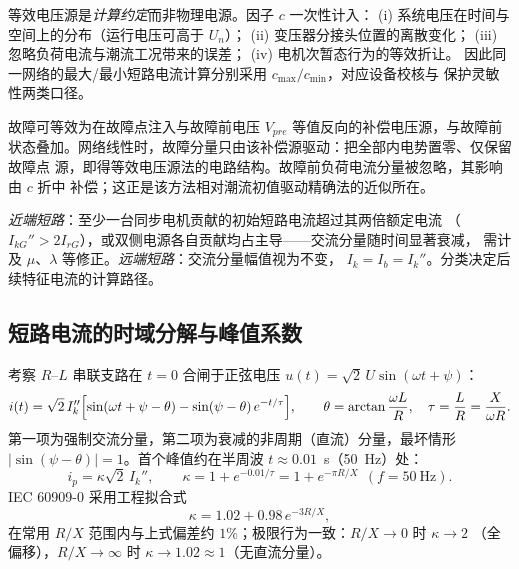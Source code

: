 \begin{remark}
等效电压源是\emph{计算约定}而非物理电源。因子 $c$ 一次性计入：
(i) 系统电压在时间与空间上的分布（运行电压可高于 $U_n$）；
(ii) 变压器分接头位置的离散变化；
(iii) 忽略负荷电流与潮流工况带来的误差；
(iv) 电机次暂态行为的等效折让。
因此同一网络的最大/最小短路电流计算分别采用 $c_{\max}/c_{\min}$，对应设备校核与
保护灵敏性两类口径。
\end{remark}

\begin{remark}[叠加原理视角]
故障可等效为在故障点注入与故障前电压 $V_{pre}$ 等值反向的补偿电压源，与故障前
状态叠加。网络线性时，故障分量只由该补偿源驱动：把全部内电势置零、仅保留故障点
源，即得等效电压源法的电路结构。故障前负荷电流分量被忽略，其影响由 $c$ 折中
补偿；这正是该方法相对潮流初值驱动精确法的近似所在。
\end{remark}

\begin{definition}[近端与远端短路]
\emph{近端短路}：至少一台同步电机贡献的初始短路电流超过其两倍额定电流
（$I_{kG}''>2I_{rG}$），或双侧电源各自贡献均占主导——交流分量随时间显著衰减，
需计及 $\mu$、$\lambda$ 等修正。\emph{远端短路}：交流分量幅值视为不变，
$I_k=I_b=I_k''$。分类决定后续特征电流的计算路径。
\end{definition}

\subsection{短路电流的时域分解与峰值系数}
考察 $R$--$L$ 串联支路在 $t=0$ 合闸于正弦电压 $u(t)=\sqrt2\,U\sin(\omega t+\psi)$：
\begin{equation}
i(t)=\sqrt2\,I_k''\Bigl[\sin(\omega t+\psi-\theta)-\sin(\psi-\theta)\,e^{-t/\tau}\Bigr],
\qquad \theta=\arctan\frac{\omega L}{R},\quad \tau=\frac{L}{R}=\frac{X}{\omega R}.
\end{equation}
第一项为强制交流分量，第二项为衰减的非周期（直流）分量，最坏情形
$|\sin(\psi-\theta)|=1$。首个峰值约在半周波 $t\approx0.01$~s（50~Hz）处：
\begin{equation}
i_p=\kappa\sqrt2\,I_k'',\qquad
\kappa=1+e^{-0.01/\tau}=1+e^{-\pi R/X}\ \ (f=50~\mathrm{Hz}).
\end{equation}
IEC 60909-0 采用工程拟合式
\begin{equation}
\kappa=1.02+0.98\,e^{-3R/X},
\end{equation}
在常用 $R/X$ 范围内与上式偏差约 $1\%$；极限行为一致：$R/X\to0$ 时 $\kappa\to2$
（全偏移），$R/X\to\infty$ 时 $\kappa\to1.02\approx1$（无直流分量）。


